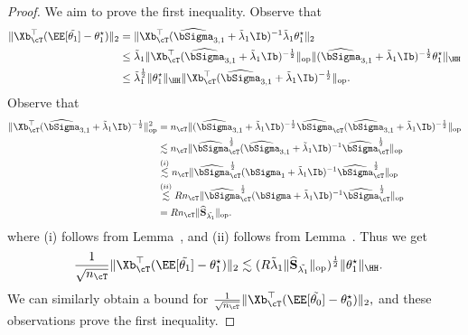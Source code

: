 \documentclass[12pt,a4paper,pdftex,onepage]{article}
\newcommand{\Sighat}{\widehat{{\bSigma}}}
\newcommand{\op}{\operatorname{op}}
\newcommand{\Shat}{\widehat{\mathbf{S}}}
\newcommand{\Sigmatreated}{\bSigma_{1}}
\begin{document}
\begin{proof}
We aim to prove the first inequality.
Observe that
\begin{align*}
\|\Xb_\cT^\top (\EE[\tilde{\theta_1}] -\theta_1^\star) \|_{2} &=  \|\Xb_\cT^\top ( \Sighat_{3,1} +\tilde{\lambda}_{1} \Ib)^{-1} \tilde{\lambda}_{1} \theta_1^\star  \|_{2}\\
&\leq \tilde{\lambda}_{1} \|\Xb_\cT^\top (\Sighat_{3,1} + \tilde{\lambda}_{1} \Ib)^{-\frac{1}{2}} \|_{\op} \| ( \Sighat_{3,1} + \tilde{\lambda}_{1} \Ib)^{-\frac{1}{2}} \theta_1^\star  \|_{\HH} \\
&\leq \tilde{\lambda}_{1}^{\frac{1}{2}} \|\theta_1^\star  \|_{\HH} \|\Xb_\cT^\top (\Sighat_{3,1} + \tilde{\lambda}_{1} \Ib)^{-\frac{1}{2}} \|_{\op}.
\end{align*}
Observe that
\begin{align*}
\|\Xb_\cT^\top (\Sighat_{3,1}+\tilde{\lambda}_{1} \Ib)^{-\frac{1}{2}} \|^2_{\op}  &= n_{\cT}  \|( \Sighat_{3,1}+\tilde{\lambda}_{1} \Ib)^{-\frac{1}{2}} \Sighat_{\cT} (\Sighat_{3,1}+\tilde{\lambda}_{1} \Ib)^{-\frac{1}{2}} \|_{\op}\\
&\lesssim n_{\cT}  \| \Sighat_{\cT}^{\frac{1}{2}} ( \Sighat_{3,1}+\tilde{\lambda}_{1} \Ib)^{-1}  \Sighat_{\cT}^{\frac{1}{2}} \|_{\op} \\
&\stackrel{{(i)}}{\lesssim}n_{\cT}  \| \Sighat_{\cT}^{\frac{1}{2}} (\Sigmatreated+\tilde{\lambda}_{1}\Ib)^{-1}  \Sighat_{\cT}^{\frac{1}{2}} \|_{\op} \\
&\stackrel{{(ii)}}{\lesssim} R n_{\cT}  \| \Sighat_{\cT}^{\frac{1}{2}} (\bSigma+\tilde{\lambda}_{1}\Ib)^{-1}  \Sighat_{\cT}^{\frac{1}{2}} \|_{\op} \\
&= Rn_{\cT}  \|{\Shat}_{\tilde{\lambda_1}} \|_{\op} .
\end{align*}
where (i) follows from Lemma~, and (ii) follows from Lemma~.
Thus we get 
\begin{align*}
\frac{1}{\sqrt{n_{\cT}}}\|\Xb_\cT^\top (\EE[\tilde{\theta_1}] -\theta_1^\star) \|_{2} 
&\lesssim (R \tilde{\lambda}_{1} \|{\Shat}_{\tilde{\lambda_1}} \|_{\op} )^{\frac{1}{2}}\|\theta_1^\star  \|_{\HH} .
\end{align*}
We can similarly obtain a bound for 
\(
\frac{1}{\sqrt{n_{\cT}}}\|\Xb_\cT^\top (\EE[\tilde{\theta_0}] - \theta_0^\star)\|_{2},
\)
and these observations prove the first inequality.



\end{proof}
\end{document}
